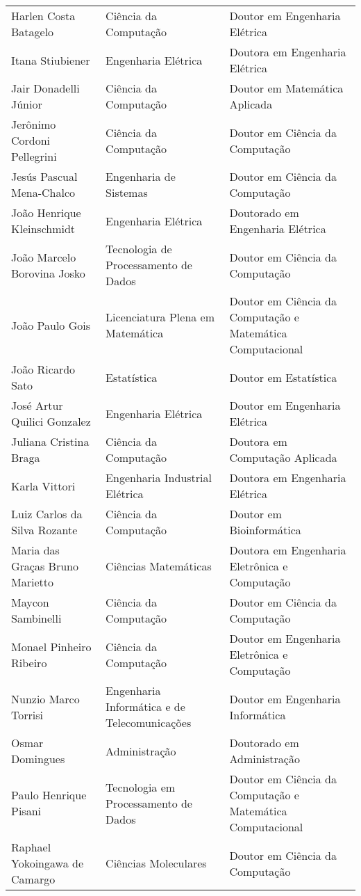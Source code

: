 {\begin{longtable}{|p{}|p{}|p{}|}
    Harlen Costa Batagelo & Ciência da Computação & Doutor em Engenharia Elétrica \\
    Itana Stiubiener & Engenharia Elétrica & Doutora em Engenharia Elétrica \\
    Jair Donadelli Júnior & Ciência da Computação & Doutor em Matemática Aplicada \\
    Jerônimo Cordoni Pellegrini & Ciência da Computação & Doutor em Ciência da Computação \\
    Jesús Pascual Mena-Chalco & Engenharia de Sistemas & Doutor em Ciência da Computação \\
    João Henrique Kleinschmidt & Engenharia Elétrica & Doutorado em Engenharia Elétrica \\
    João Marcelo Borovina Josko & Tecnologia de Processamento de Dados & Doutor em Ciência da Computação \\
    João Paulo Gois & Licenciatura Plena em Matemática & Doutor em Ciência da Computação e Matemática Computacional \\
    João Ricardo Sato & Estatística & Doutor em Estatística \\
    José Artur Quilici Gonzalez & Engenharia Elétrica & Doutor em Engenharia Elétrica \\
    Juliana Cristina Braga & Ciência da Computação & Doutora em Computação Aplicada \\
    Karla Vittori & Engenharia Industrial Elétrica & Doutora em Engenharia Elétrica \\
    Luiz Carlos da Silva Rozante & Ciência da Computação & Doutor em Bioinformática \\
    Maria das Graças Bruno Marietto & Ciências Matemáticas & Doutora em Engenharia Eletrônica e Computação \\
    Maycon Sambinelli & Ciência da Computação & Doutor em Ciência da Computação \\
    Monael Pinheiro Ribeiro & Ciência da Computação & Doutor em Engenharia Eletrônica e Computação \\
    Nunzio Marco Torrisi & Engenharia Informática e de Telecomunicações & Doutor em Engenharia Informática \\
    Osmar Domingues & Administração & Doutorado em Administração \\
    Paulo Henrique Pisani & Tecnologia em Processamento de Dados & Doutor em Ciência da Computação e Matemática Computacional \\
    Raphael Yokoingawa de Camargo & Ciências Moleculares & Doutor em Ciência da Computação \\

\end{longtable}}
